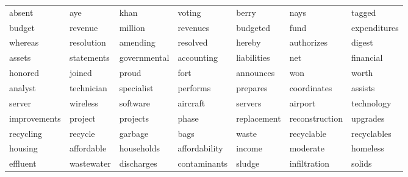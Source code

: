 \begin{table}[ht]
\begin{tabular}{lllllll}
  \cellcolor{blue!20}absent & \cellcolor{blue!20}aye & \cellcolor{blue!20}khan & \cellcolor{blue!20}voting & \cellcolor{blue!20}berry & \cellcolor{blue!20}nays & \cellcolor{blue!20}tagged \\ 
  \cellcolor{blue!20}budget & \cellcolor{blue!20}revenue & \cellcolor{blue!20}million & \cellcolor{blue!20}revenues & \cellcolor{blue!20}budgeted & \cellcolor{blue!20}fund & \cellcolor{blue!20}expenditures \\ 
  \cellcolor{blue!10}whereas & \cellcolor{blue!10}resolution & \cellcolor{blue!10}amending & \cellcolor{blue!10}resolved & \cellcolor{blue!10}hereby & \cellcolor{blue!10}authorizes & \cellcolor{blue!10}digest \\ 
  \cellcolor{blue!10}assets & \cellcolor{blue!10}statements & \cellcolor{blue!10}governmental & \cellcolor{blue!10}accounting & \cellcolor{blue!10}liabilities & \cellcolor{blue!10}net & \cellcolor{blue!10}financial \\ 
  \cellcolor{red!30}honored & \cellcolor{red!30}joined & \cellcolor{red!30}proud & \cellcolor{red!30}fort & \cellcolor{red!30}announces & \cellcolor{red!30}won & \cellcolor{red!30}worth \\ 
  \cellcolor{white}analyst & \cellcolor{white}technician & \cellcolor{white}specialist & \cellcolor{white}performs & \cellcolor{white}prepares & \cellcolor{white}coordinates & \cellcolor{white}assists \\ 
  \cellcolor{white}server & \cellcolor{white}wireless & \cellcolor{white}software & \cellcolor{white}aircraft & \cellcolor{white}servers & \cellcolor{white}airport & \cellcolor{white}technology \\ 
  \cellcolor{blue!10}improvements & \cellcolor{blue!10}project & \cellcolor{blue!10}projects & \cellcolor{blue!10}phase & \cellcolor{blue!10}replacement & \cellcolor{blue!10}reconstruction & \cellcolor{blue!10}upgrades \\ 
  \cellcolor{red!10}recycling & \cellcolor{red!10}recycle & \cellcolor{red!10}garbage & \cellcolor{red!10}bags & \cellcolor{red!10}waste & \cellcolor{red!10}recyclable & \cellcolor{red!10}recyclables \\ 
  \cellcolor{blue!10}housing & \cellcolor{blue!10}affordable & \cellcolor{blue!10}households & \cellcolor{blue!10}affordability & \cellcolor{blue!10}income & \cellcolor{blue!10}moderate & \cellcolor{blue!10}homeless \\ 
  \cellcolor{red!20}effluent & \cellcolor{red!20}wastewater & \cellcolor{red!20}discharges & \cellcolor{red!20}contaminants & \cellcolor{red!20}sludge & \cellcolor{red!20}infiltration & \cellcolor{red!20}solids \\ 

\end{tabular}
\end{table}
